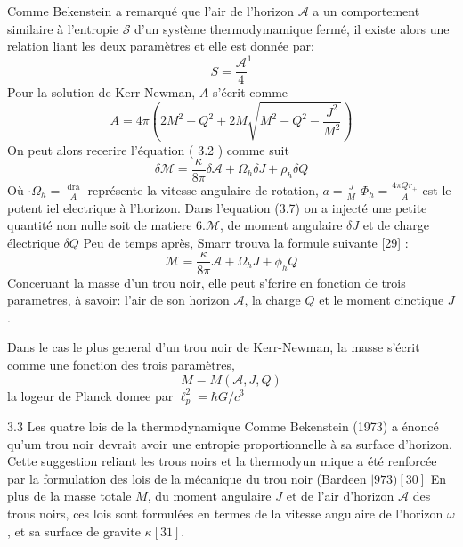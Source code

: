 \documentclass[12pt,  a4paper, openright]{report} %
\begin{document}
Comme Bekenstein a remarqué que l'air de l'horizon $\mathcal{A}$ a un comportement similaire à l'entropie $\mathcal{S}$ d'un système thermodymamique fermé, il existe alors une relation liant les deux paramètres et elle est donnée par:
$$
S=\frac{\mathcal{A}}{4}^{1}
$$
Pour la solution de Kerr-Newman, $A$ s'écrit comme
$$
A=4 \pi\left(2 M^{2}-Q^{2}+2 M \sqrt{M^{2}-Q^{2}-\frac{J^{2}}{M^{2}}}\right)
$$
On peut alors recerire l'équation ( 3.2 ) comme suit
$$
\delta \mathcal{M}=\frac{\kappa}{8 \pi} \delta \mathcal{A}+\Omega_{h} \delta J+\rho_{h} \delta Q
$$
Où
$\cdot \Omega_{h}=\frac{\text { dra }}{A}$ représente la vitesse angulaire de rotation, $a=\frac{J}{M}$
$\Phi_{h}=\frac{4 \pi Q r_{+}}{A}$ est le potent iel electrique à l'horizon.
Dans l'equation (3.7) on a injecté une petite quantité non nulle soit de matiere $6 . \mathcal{M}$, de moment angulaire $\delta J$ et de charge électrique $\delta Q$ Peu de temps après, Smarr trouva la formule suivante [29] :
$$
\mathcal{M}=\frac{\kappa}{8 \pi} \mathcal{A}+\Omega_{h} J+\phi_{h} Q
$$
Conceruant la masse d'un trou noir, elle peut s'fcrire en fonction de trois parametres, à savoir: l'air de son horizon $\mathcal{A}$, la charge $Q$ et le moment cinctique $J$.

Dans le cas le plus general d'un trou noir de Kerr-Newman, la masse s'écrit comme une fonction des trois paramètres,
$$
M=M(\mathcal{A}, J, Q)
$$
la logeur de Planck domee par $\ell_{p}^{2}=\hbar G / c^{3}$


3.3 Les quatre lois de la thermodynamique
Comme Bekenstein (1973) a énoncé qu'um trou noir devrait avoir une entropie proportionnelle à sa surface d'horizon. Cette suggestion reliant les trous noirs et la thermodyun mique a été renforcée par la formulation des lois de la mécanique du trou noir (Bardeen $\mid 973)[30]$
En plus de la masse totale $M$, du moment angulaire $J$ et de l'air d'horizon $\mathcal{A}$ des trous noirs, ces lois sont formulées en termes de la vitesse angulaire de l'horizon $\omega$, et sa surface de gravite $\kappa[31]$.
\end{document}
